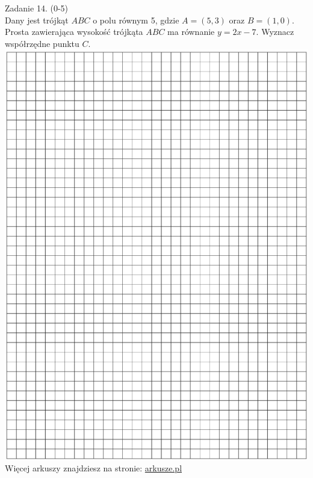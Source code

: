 \documentclass[10pt]{article}
\begin{document}
Zadanie 14. (0-5)\\
Dany jest trójkąt \(A B C\) o polu równym 5, gdzie \(A=(5,3)\) oraz \(B=(1,0)\). Prosta zawierająca wysokość trójkąta \(A B C\) ma równanie \(y=2 x-7\). Wyznacz współrzędne punktu \(C\).\\
\includegraphics[max width=\textwidth, center]{2024_11_21_5abc0108fbbc287103ecg-14}\\
Więcej arkuszy znajdziesz na stronie: \href{http://arkusze.pl}{arkusze.pl}\\
\end{document}
